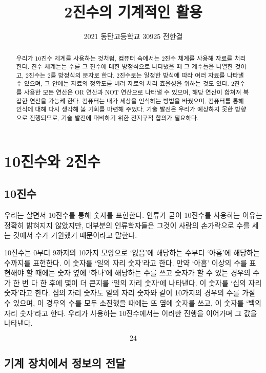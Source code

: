 \documentclass{article}
\title{2진수의 기계적인 활용}
\author{2021 동탄고등학교 30925 전한결}
\begin{document}
    
\maketitle
\pagebreak
\tableofcontents
\pagebreak

\begin{abstract}
    우리가 10진수 체계를 사용하는 것처럼, 컴퓨터 속에서는 2진수 체계를 사용해 자료를 처리한다.
    진수 체계는는 수를 그 진수에 대한 방정식으로 나타냈을 때 그 계수들을 나열한 것이고, 2진수는
    2를 방정식의 문자로 한다.
    2진수로는 일정한 방식에 따라 여러 자료를 나타낼 수 있으며, 그 안에는 자료의 정확도를 버려
    자료의 처리 효율성을 위하는 것도 있다.
    2진수를 사용한 모든 연산은 OR 연산과 NOT 연산으로 나타낼 수 있으며, 해당 연산이 합쳐져 복잡한
    연산을 가능케 한다.
    컴퓨터는 내가 세상을 인식하는 방법을 바꿨으며, 컴퓨터를 통해 인식에 대해 다시 생각해 볼 기회를
    마련해 주었다.
    기술 발전은 우리가 예상하지 못한 방향으로 진행되므로, 기술 발전에 대비하기 위한 전지구적 합의가
    필요하다.
\end{abstract}

\section{10진수와 2진수}

\subsection{10진수}

우리는 살면서 10진수를 통해 숫자를 표현한다.
인류가 굳이 10진수를 사용하는 이유는 정확히 밝혀지지 않았지만,
대부분의 인류학자들은 그것이 사람의 손가락으로 수를 세는 것에서
수가 기원했기 때문이라고 말한다.

10진수는 0부터 9까지의 10가지 모양으로 `없음'에 해당하는 수부터 `아홉'에 해당하는
수까지를 표현한다. 이 숫자를 `일의 자리 숫자'라고 한다.
만약 `아홉' 이상의 수를 표현해야 할 때에는 숫자 옆에 `하나'에
해당하는 수를 쓰고 숫자가 할 수 있는 경우의 수가 한 번 다 한 후에 몇이 더 큰지를
`일의 자리 숫자`에 나타낸다. 이 숫자를 `십의 자리 숫자'라고 한다.
십의 자리 숫자도 일의 자리 숫자와 같이 10가지의 경우의 수를 가질 수 있으며,
이 경우의 수를 모두 소진했을 때에는 또 옆에 숫자를 쓰고, 이 숫자를
`백의 자리 숫자'라고 한다.
우리가 사용하는 10진수에서는 이러한 진행을 이어가며 그 값을 나타낸다.

$$
24
$$

\subsection{기계 장치에서 정보의 전달}
\end{document}
